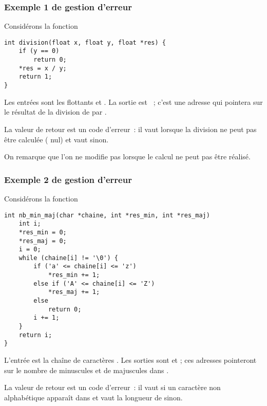 \begin{frame}[fragile] \frametitle{Exemple 1 de gestion d'erreur}
Considérons la fonction
\begin{lstlisting}
int division(float x, float y, float *res) {
    if (y == 0)
        return 0;
    *res = x / y;
    return 1;
}
\end{lstlisting}

Les entrées sont les flottants  et . La sortie est 
~; c'est une adresse qui pointera sur le résultat de la 
division de  par .
\smallskip

La valeur de retour est un \alert{code d'erreur}~: il vaut 
lorsque la division ne peut pas être calculée ( nul) et vaut
 sinon.
\smallskip

On remarque que l'on ne modifie pas  lorsque le calcul ne 
peut pas être réalisé.
\end{frame}

\begin{frame}[fragile] \frametitle{Exemple 2 de gestion d'erreur}
\footnotesize
Considérons la fonction
\begin{lstlisting}
int nb_min_maj(char *chaine, int *res_min, int *res_maj)
    int i;
    *res_min = 0;
    *res_maj = 0;
    i = 0;
    while (chaine[i] != '\0') {
        if ('a' <= chaine[i] <= 'z')
            *res_min += 1;
        else if ('A' <= chaine[i] <= 'Z')
            *res_maj += 1;
        else
            return 0;
        i += 1;
    }
    return i;
}
\end{lstlisting}

L'entrée est la chaîne de caractères . Les sorties sont 
 et  ; ces adresses pointeront
sur le nombre de minuscules et de majuscules dans .
\smallskip

La valeur de retour est un \alert{code d'erreur}~: il vaut 
si un caractère non alphabétique apparaît dans  et vaut 
la longueur de  sinon.
\end{frame}

